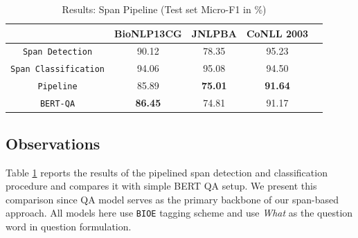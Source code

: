\begin{table}[h!]
\centering
\begin{tabular}{|c|c|c|c|c|}\hline
	\textbf{} & \textbf{BioNLP13CG} & \textbf{JNLPBA} & \textbf{CoNLL 2003}\\\hline
	\texttt{Span Detection} & 90.12 & 78.35 & 95.23\\\hline
	\texttt{Span Classification} & 94.06 & 95.08 & 94.50\\\hline
	\texttt{Pipeline} & 85.89 & \textbf{75.01} & \textbf{91.64}\\\hline
	\texttt{BERT-QA} & \textbf{86.45} & 74.81 & 91.17\\\hline
	\end{tabular}
    \caption{Results: Span Pipeline (Test set Micro-F1 in \%)}
    \label{tab:res_span}
\end{table}

\subsection{Observations}
Table \ref{tab:res_span} reports the results of the pipelined span detection and classification procedure and compares it with simple BERT QA setup. We present this comparison since QA model serves as the primary backbone of our span-based approach. All models here use \texttt{BIOE} tagging scheme and use \textit{What} as the question word in question formulation.

